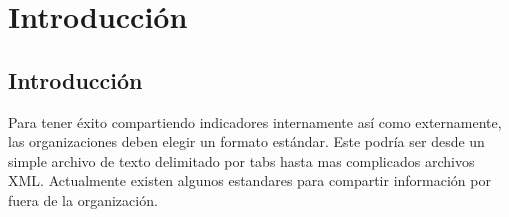
\chapter{Introducción} %

\label{Introducción} %

\lhead{\til}
\rhead{\fu}


\section{Introducción}
Para tener éxito compartiendo indicadores internamente así como externamente, 
las organizaciones deben elegir un formato estándar. Este podría ser desde un 
simple archivo de texto delimitado por tabs hasta mas complicados archivos XML. 
Actualmente existen algunos estandares para compartir información por fuera de la 
organización.




